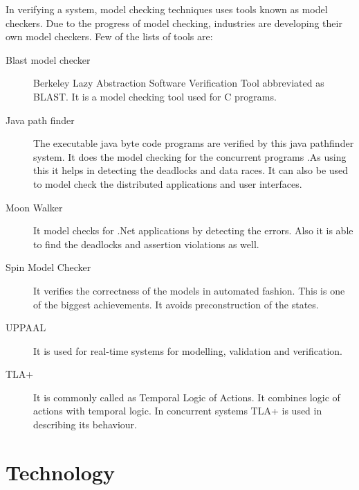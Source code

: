 \documentclass{article}
\begin{document}
In verifying a system, model checking techniques uses tools known as model checkers. Due to the progress of model checking, industries are developing their own model checkers.
Few of the lists of tools are:
\begin{description}
\item[Blast model checker] Berkeley Lazy Abstraction Software Verification Tool abbreviated as BLAST. It is a model checking tool used for C programs.
\item[Java path finder] The executable java byte code programs are verified by this java pathfinder system. It does the model checking for the concurrent programs .As using this it helps in detecting the deadlocks and data races. It can also be used to model check the distributed applications and user interfaces.
\item[Moon Walker] It model checks for .Net applications by detecting the errors. Also it is able to find the deadlocks and assertion violations as well.
\item[Spin Model Checker] It verifies the correctness of the models in automated fashion. This is one of the biggest achievements. It avoids preconstruction of the states.
\item[UPPAAL] It is used for real-time systems for modelling, validation and verification.
\item[TLA+] It is commonly called as Temporal Logic of Actions. It combines logic of actions with temporal logic. In concurrent systems TLA+ is used in describing its behaviour.
\end{description}



\section{Technology}
\label{sec:Technology}
\end{document}
